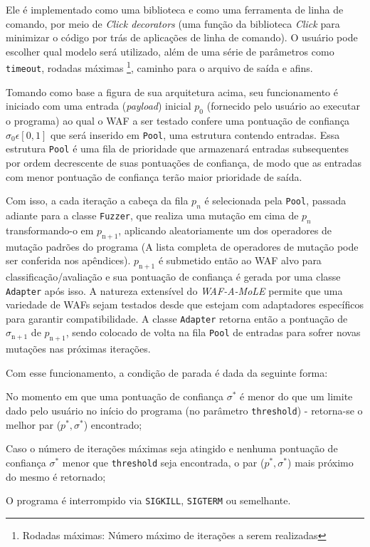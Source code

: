 Ele é implementado como uma biblioteca e como uma ferramenta de linha de comando, por meio de \textit{Click decorators} (uma função da biblioteca \textit{Click} para minimizar o código por trás de aplicações de linha de comando). O usuário pode escolher qual modelo será utilizado, além de uma série de parâmetros como \verb+timeout+, rodadas máximas \footnote{Rodadas máximas: Número máximo de iterações a serem realizadas}, caminho para o arquivo de saída e afins.

Tomando como base a figura de sua arquitetura acima, seu funcionamento é iniciado com uma entrada (\textit{payload}) inicial $p_0$ (fornecido pelo usuário ao executar o programa) ao qual o WAF a ser testado confere uma pontuação de confiança $\sigma_0 \epsilon [0, 1]$ que será inserido em \verb+Pool+, uma estrutura contendo entradas. Essa estrutura \verb+Pool+ é uma fila de prioridade que armazenará entradas subsequentes por ordem decrescente de suas pontuações de confiança, de modo que as entradas com menor pontuação de confiança terão maior prioridade de saída.

Com isso, a cada iteração a cabeça da fila $p_n$ é selecionada pela \verb+Pool+, passada adiante para a classe \verb+Fuzzer+, que realiza uma mutação em cima de $p_n$ transformando-o em $p_{\mathrm{n+1}}$, aplicando aleatoriamente um dos operadores de mutação padrões do programa (A lista completa de operadores de mutação pode ser conferida nos apêndices). $p_{\mathrm{n+1}}$ é submetido então ao WAF alvo para classificação/avaliação e sua pontuação de confiança é gerada por uma classe \verb+Adapter+ após isso. A natureza extensível do \textit{WAF-A-MoLE} permite que uma variedade de WAFs sejam testados desde que estejam com adaptadores específicos para garantir compatibilidade. A classe \verb+Adapter+ retorna então a pontuação de $\sigma_{\mathrm{n+1}}$ de $p_{\mathrm{n+1}}$, sendo colocado de volta na fila \verb+Pool+ de entradas para sofrer novas mutações nas próximas iterações.

\bigskip 

Com esse funcionamento, a condição de parada é dada da seguinte forma:
\begin{alineas}
\item No momento em que uma pontuação de confiança $\sigma^*$ é menor do que um limite dado pelo usuário no início do programa (no parâmetro \verb+threshold+) - retorna-se o melhor par ($p^*, \sigma^*$) encontrado;
\item Caso o número de iterações máximas seja atingido e nenhuma pontuação de confiança $\sigma^*$ menor que \verb+threshold+ seja encontrada, o par ($p^*, \sigma^*$) mais próximo do mesmo é retornado;
\item O programa é interrompido via \verb+SIGKILL+, \verb+SIGTERM+ ou semelhante.
\end{alineas}

